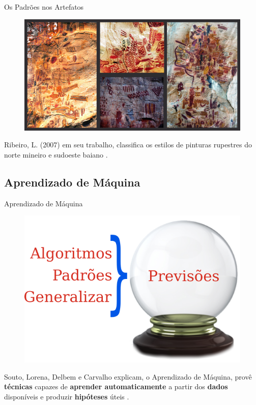     \begin{frame}[fragile]{Os Padrões nos Artefatos}
        \begin{figure}[H]
        \begin{center}
            \includegraphics[scale=0.60]{images/arte_rupestre.png}
        \end{center}
        \end{figure}

        Ribeiro, L. (2007) em seu trabalho, classifica os estilos de pinturas
        rupestres do norte mineiro e sudoeste baiano
        \cite{ribeiro2007repensando}.
    \end{frame}

\subsection{Aprendizado de Máquina}
    \begin{frame}[fragile]{Aprendizado de Máquina}
        \begin{figure}[H]
        \begin{center}
            \includegraphics[scale=0.50]{images/previsao.png}
        \end{center}
        \end{figure}

        Souto, Lorena, Delbem e Carvalho explicam, o Aprendizado de Máquina,
        provê \textbf{técnicas} capazes de \textbf{aprender automaticamente} a 
        partir dos \textbf{dados} disponíveis e produzir \textbf{hipóteses} 
        úteis \cite{de2003tecnicas}.

  \end{frame}

